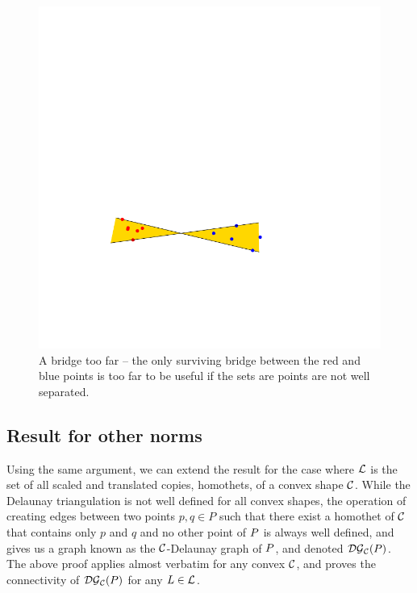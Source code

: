 \documentclass[12pt]{article}%
\begin{document}
\begin{figure}[h]
    \hfill%
    \includegraphics[page=3]{figs/bad_example}
    \hfill%
    \phantom{}
    \caption{A bridge too far -- the only surviving bridge between the
       red and blue points is too far to be useful if the sets are
       points are not well separated.}
\end{figure}




\subsection{Result for other norms}


Using the same argument, we can extend the result for the case where
$\mathcal{L}$ is the set of all scaled and translated copies, homothets, of a
convex shape $\mathcal{C}$. While the Delaunay triangulation is not well
defined for all convex shapes, the operation of creating edges between
two points $p,q\in P$ such that there exist a homothet of $\mathcal{C}$ that
contains only $p$ and $q$ and no other point of $P$ is always well
defined, and gives us a graph known as the $\mathcal{C}$-Delaunay graph of
$P$, and denoted $\mathcal{DG}_{\mathcal{C}}(P)$. The above proof applies almost
verbatim for any convex $\mathcal{C}$, and proves the connectivity of
$\mathcal{DG}_{\mathcal{C}}(P)$ for any $L\in \mathcal{L}$.
\end{document}
